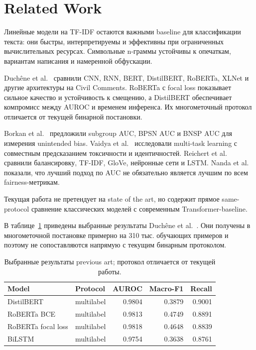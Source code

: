 \documentclass{article}
\begin{document}
\section{Related Work}
\label{sec:related}
Линейные модели на TF-IDF остаются важными baseline для классификации текста:
они быстры, интерпретируемы и эффективны при ограниченных вычислительных
ресурсах. Символьные n-граммы устойчивы к опечаткам, вариантам написания и
намеренной обфускации.

Duchêne et al.~\cite{duchene2023benchmark} сравнили CNN, RNN, BERT, DistilBERT,
RoBERTa, XLNet и другие архитектуры на Civil Comments. RoBERTa с focal loss
показывает сильное качество и устойчивость к смещению, а DistilBERT обеспечивает
компромисс между AUROC и временем инференса. Их многометочный протокол отличается
от текущей бинарной постановки.

Borkan et al.~\cite{borkan2019nuanced} предложили subgroup AUC, BPSN AUC и BNSP
AUC для измерения unintended bias. Vaidya et al.~\cite{vaidya2019empirical}
исследовали multi-task learning с совместным предсказанием токсичности и
идентичностей. Reichert et al.~\cite{reichert2020reading} сравнили балансировку,
TF-IDF, GloVe, нейронные сети и LSTM. Nanda et
al.~\cite{nanda2021empirical} показали, что лучший подход по AUC не обязательно
является лучшим по всем fairness-метрикам.

Текущая работа не претендует на state of the art, но содержит прямое
same-protocol сравнение классических моделей с современным Transformer-baseline.

В таблице~\ref{tab:previous-art} приведены выбранные результаты Duch\^ene et
al.~\cite{duchene2023benchmark}. Они получены в многометочной постановке примерно
на 310 тыс. обучающих примеров и поэтому не сопоставляются напрямую с текущим
бинарным протоколом.

\begin{table}[tbh!]
\centering
\small
\begin{tabular}{|l|l|r|r|r|}
\hline
Model & Protocol & AUROC & Macro-F1 & Recall\\
\hline
DistilBERT & multilabel & 0.9804 & 0.3879 & 0.9001\\
RoBERTa BCE & multilabel & 0.9813 & 0.4749 & 0.8891\\
RoBERTa focal loss & multilabel & 0.9818 & 0.4648 & 0.8839\\
BiLSTM & multilabel & 0.9754 & 0.3638 & 0.8761\\
\hline
\end{tabular}
\caption{Выбранные результаты previous art; протокол отличается от текущей работы.}
\label{tab:previous-art}
\end{table}
\end{document}
